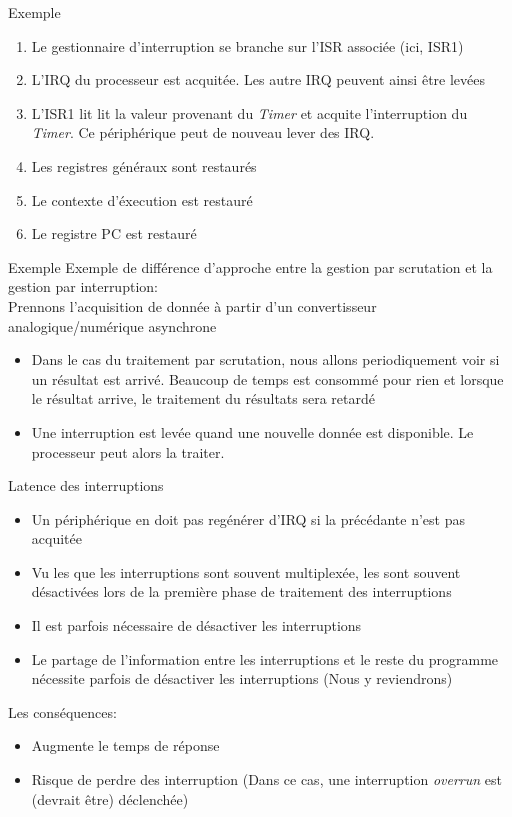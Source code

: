 \begin{frame}{Exemple}
  \begin{enumerate}
  \item Le  gestionnaire d'interruption se branche  sur l'ISR associée
    (ici, ISR1)
  \item L'IRQ du processeur est  acquitée. Les autre IRQ peuvent ainsi
    être levées
  \item L'ISR1 lit lit la  valeur provenant du \emph{Timer} et acquite
    l'interruption  du \emph{Timer}. Ce  périphérique peut  de nouveau
    lever des IRQ.
  \item Les registres généraux sont restaurés
  \item Le contexte d'éxecution est restauré
  \item Le registre PC est restauré
  \end{enumerate}
\end{frame} 

\begin{frame}{Exemple}
  Exemple de différence d'approche entre la gestion par scrutation et 
  la gestion par interruption:\\

  Prennons  l'acquisition  de   donnée  à  partir  d'un  convertisseur
  analogique/numérique asynchrone
  \begin{itemize}
  \item  Dans  le  cas  du  traitement  par  scrutation,  nous  allons
    periodiquement voir  si un résultat est arrivé.  Beaucoup de temps
    est  consommé  pour  rien   et  lorsque  le  résultat  arrive,  le
    traitement du résultats sera retardé
  \item  Une interruption  est  levée quand  une  nouvelle donnée  est
    disponible. Le processeur peut alors la traiter.
  \end{itemize}
\end{frame} 

\begin{frame}{Latence des interruptions}
  \begin{itemize} 
  \item Un périphérique  en doit pas regénérer d'IRQ  si la précédante
    n'est pas acquitée
  \item  Vu les que  les interruptions  sont souvent  multiplexée, les
    sont souvent  désactivées lors de la première  phase de traitement
    des interruptions
  \item Il est parfois nécessaire de désactiver les interruptions 
  \item  Le partage  de l'information  entre les  interruptions  et le
    reste   du   programme  nécessite   parfois   de  désactiver   les
    interruptions (Nous y reviendrons)
  \end{itemize} 
  Les conséquences:
  \begin{itemize} 
  \item Augmente le temps de réponse
  \item  Risque   de  perdre  des  interruption  (Dans   ce  cas,  une
    interruption \emph{overrun} est (devrait être) déclenchée)
  \end{itemize} 
\end{frame} 

